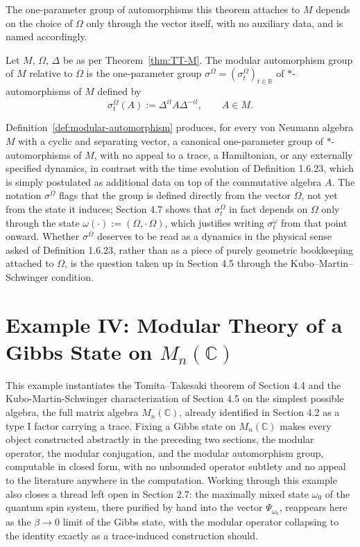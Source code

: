 \noindent The one-parameter group of automorphisms this theorem attaches to $M$ depends on the choice of $\Omega$ only through the vector itself, with no auxiliary data, and is named accordingly.

\begin{definition}\label{def:modular-automorphism}
	Let $M$, $\Omega$, $\Delta$ be as per Theorem~\ref{thm:TT-M}. The modular automorphism group of $M$ relative to $\Omega$ is the one-parameter group $\sigma^\Omega = (\sigma^\Omega_t)_{t \in \mathbb{R}}$ of $*$-automorphisms of $M$ defined by
	\[
	\sigma^\Omega_t(A) := \Delta^{it} A \Delta^{-it}, \qquad A \in M.
	\]
\end{definition}

\begin{remark}
	Definition~\ref{def:modular-automorphism} produces, for every von Neumann algebra $M$ with a cyclic and separating vector, a canonical one-parameter group of $*$-automorphisms of $M$, with no appeal to a trace, a Hamiltonian, or any externally specified dynamics, in contrast with the time evolution of Definition 1.6.23, which is simply postulated as additional data on top of the commutative algebra $A$. The notation $\sigma^\Omega$ flags that the group is defined directly from the vector $\Omega$, not yet from the state it induces; Section 4.7 shows that $\sigma^\Omega_t$ in fact depends on $\Omega$ only through the state $\omega(\cdot) := (\Omega,\cdot\,\Omega)$, which justifies writing $\sigma^\omega_t$ from that point onward. Whether $\sigma^\Omega$ deserves to be read as a dynamics in the physical sense asked of Definition 1.6.23, rather than as a piece of purely geometric bookkeeping attached to $\Omega$, is the question taken up in Section 4.5 through the Kubo--Martin--Schwinger condition.
\end{remark}

\section{Example IV: Modular Theory of a Gibbs State on $M_n(\mathbb{C})$}\label{sec:example-gibbs}

This example instantiates the Tomita--Takesaki theorem of Section 4.4 and the Kubo-Martin-Schwinger characterization of Section 4.5 on the simplest possible algebra, the full matrix algebra $M_n(\mathbb{C})$, already identified in Section 4.2 as a type I factor carrying a trace. Fixing a Gibbs state on $M_n(\mathbb{C})$ makes every object constructed abstractly in the preceding two sections, the modular operator, the modular conjugation, and the modular automorphism group, computable in closed form, with no unbounded operator subtlety and no appeal to the literature anywhere in the computation. Working through this example also closes a thread left open in Section 2.7: the maximally mixed state $\omega_0$ of the quantum spin system, there purified by hand into the vector $\Psi_{\omega_0}$, reappears here as the $\beta \to 0$ limit of the Gibbs state, with the modular operator collapsing to the identity exactly as a trace-induced construction should.


